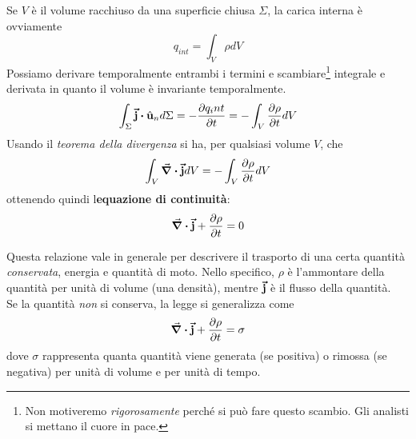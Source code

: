 Se $V$ è il volume racchiuso da una superficie chiusa $\Sigma$, la carica interna è ovviamente
\begin{equation*}
	q_{int}=\int_V\rho dV
\end{equation*}
Possiamo derivare temporalmente entrambi i termini e scambiare\footnote{Non motiveremo \textit{rigorosamente} perché si può fare questo scambio. Gli analisti si mettano il cuore in pace.} integrale e derivata in quanto il volume è invariante temporalmente.
\begin{equation*}
	\int_{\Sigma}\vba{j}\vdot\vbh{u}_nd\Sigma=-\pdv{q_int}{t}=-\int_V\pdv{\rho}{t} dV %
\end{equation*}
Usando il \textit{teorema della divergenza} si ha, per qualsiasi volume $V$, che
\begin{equation*}
	\int_V\div{\vb*{\va{j}}}dV=-\int_V\pdv{\rho}{t} dV
\end{equation*}
ottenendo quindi l\textbf{equazione di continuità}:
\begin{equation}
	\div{\vb*{\va{j}}}+\pdv{\rho}{t}=0
\end{equation}
\begin{digression}
	Questa relazione vale in generale per descrivere il trasporto di una certa quantità \textit{conservata}, energia e quantità di moto.
	Nello specifico, $\rho$ è l'ammontare della quantità per unità di volume (una densità), mentre $\vb*{\va{j}}$ è il flusso della quantità.\\
	Se la quantità \textit{non} si conserva, la legge si generalizza come
	\begin{equation}
		\div{\vb*{\va{j}}}+\pdv{\rho}{t}=\sigma
	\end{equation}
dove $\sigma$ rappresenta quanta quantità viene generata (se positiva) o rimossa (se negativa) per unità di volume e per unità di tempo.
\end{digression}
